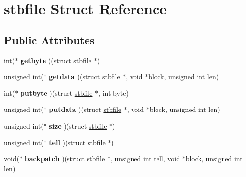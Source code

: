 \hypertarget{structstbfile}{}\section{stbfile Struct Reference}
\label{structstbfile}
\subsection*{Public Attributes}
\begin{DoxyCompactItemize}
\item 
int($\ast$ {\bfseries getbyte} )(struct \hyperlink{structstbfile}{stbfile} $\ast$)\hypertarget{structstbfile_a2be637faeb72d0ec50fe86c3959e237c}{}\label{structstbfile_a2be637faeb72d0ec50fe86c3959e237c}

\item 
unsigned int($\ast$ {\bfseries getdata} )(struct \hyperlink{structstbfile}{stbfile} $\ast$, void $\ast$block, unsigned int len)\hypertarget{structstbfile_ac8120e4a86975fbac204886c797dc3b5}{}\label{structstbfile_ac8120e4a86975fbac204886c797dc3b5}

\item 
int($\ast$ {\bfseries putbyte} )(struct \hyperlink{structstbfile}{stbfile} $\ast$, int byte)\hypertarget{structstbfile_ae5d5578aefa43dcb76ab121d4df81941}{}\label{structstbfile_ae5d5578aefa43dcb76ab121d4df81941}

\item 
unsigned int($\ast$ {\bfseries putdata} )(struct \hyperlink{structstbfile}{stbfile} $\ast$, void $\ast$block, unsigned int len)\hypertarget{structstbfile_ae54197841b395c72b892aa9f68e137ea}{}\label{structstbfile_ae54197841b395c72b892aa9f68e137ea}

\item 
unsigned int($\ast$ {\bfseries size} )(struct \hyperlink{structstbfile}{stbfile} $\ast$)\hypertarget{structstbfile_a15c35a5f5cd320498cabb45e57b12148}{}\label{structstbfile_a15c35a5f5cd320498cabb45e57b12148}

\item 
unsigned int($\ast$ {\bfseries tell} )(struct \hyperlink{structstbfile}{stbfile} $\ast$)\hypertarget{structstbfile_a9a742660b6417f81bb0ca7b34cbdf860}{}\label{structstbfile_a9a742660b6417f81bb0ca7b34cbdf860}

\item 
void($\ast$ {\bfseries backpatch} )(struct \hyperlink{structstbfile}{stbfile} $\ast$, unsigned int tell, void $\ast$block, unsigned int len)\hypertarget{structstbfile_a5eb16e6b3d0aac06c6e5fe5f118d7e30}{}\label{structstbfile_a5eb16e6b3d0aac06c6e5fe5f118d7e30}


\end{DoxyCompactItemize}
